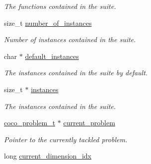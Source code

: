 \begin{DoxyCompactItemize}
\begin{DoxyCompactList}\small\item\em The functions contained in the suite. \end{DoxyCompactList}\item 
size\+\_\+t \hyperlink{structcoco__suite__s_a93e1a975a7ccd9dd874c03969032ecce}{number\+\_\+of\+\_\+instances}\hypertarget{structcoco__suite__s_a93e1a975a7ccd9dd874c03969032ecce}{}\label{structcoco__suite__s_a93e1a975a7ccd9dd874c03969032ecce}

\begin{DoxyCompactList}\small\item\em Number of instances contained in the suite. \end{DoxyCompactList}\item 
char $\ast$ \hyperlink{structcoco__suite__s_aeffdcaa396c2e8b41f9b46b76761fce8}{default\+\_\+instances}\hypertarget{structcoco__suite__s_aeffdcaa396c2e8b41f9b46b76761fce8}{}\label{structcoco__suite__s_aeffdcaa396c2e8b41f9b46b76761fce8}

\begin{DoxyCompactList}\small\item\em The instances contained in the suite by default. \end{DoxyCompactList}\item 
size\+\_\+t $\ast$ \hyperlink{structcoco__suite__s_a6255e3f0845779b07a622e16f43373e6}{instances}\hypertarget{structcoco__suite__s_a6255e3f0845779b07a622e16f43373e6}{}\label{structcoco__suite__s_a6255e3f0845779b07a622e16f43373e6}

\begin{DoxyCompactList}\small\item\em The instances contained in the suite. \end{DoxyCompactList}\item 
\hyperlink{structcoco__problem__s}{coco\+\_\+problem\+\_\+t} $\ast$ \hyperlink{structcoco__suite__s_a334b781eed4522ab19a6dc9cabfefe0b}{current\+\_\+problem}\hypertarget{structcoco__suite__s_a334b781eed4522ab19a6dc9cabfefe0b}{}\label{structcoco__suite__s_a334b781eed4522ab19a6dc9cabfefe0b}

\begin{DoxyCompactList}\small\item\em Pointer to the currently tackled problem. \end{DoxyCompactList}\item 
long \hyperlink{structcoco__suite__s_a6ecc22f5c74c9630cd34f1056676d05e}{current\+\_\+dimension\+\_\+idx}\hypertarget{structcoco__suite__s_a6ecc22f5c74c9630cd34f1056676d05e}{}\label{structcoco__suite__s_a6ecc22f5c74c9630cd34f1056676d05e}


\end{DoxyCompactItemize}
